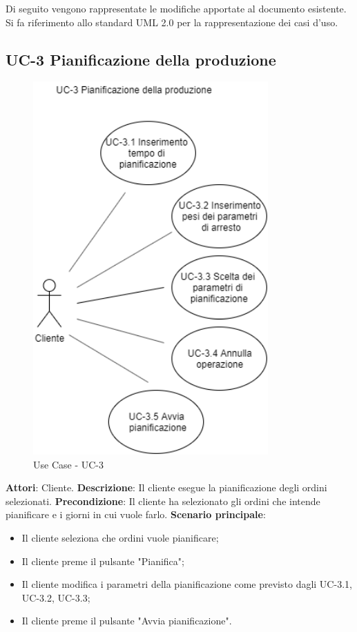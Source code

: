 Di seguito vengono rappresentate le modifiche apportate al documento esistente.
Si fa riferimento allo standard UML 2.0 per la rappresentazione dei casi d'uso.

\subsection*{UC-3 Pianificazione della produzione}

\begin{figure}[H]
	\includegraphics[width=9cm]{immagini/UC1.png}
	\centering
	\caption{Use Case - UC-3}
\end{figure}

\textbf{Attori}: Cliente. \newline
\textbf{Descrizione}: Il cliente esegue la pianificazione degli ordini selezionati.\newline
\textbf{Precondizione}: Il cliente ha selezionato gli ordini che intende pianificare e i giorni in cui vuole farlo.\newline
\textbf{Scenario principale}: \begin{itemize}
    \item Il cliente seleziona che ordini vuole pianificare;
    \item Il cliente preme il pulsante "Pianifica";
    \item Il cliente modifica i parametri della pianificazione come previsto dagli UC-3.1, UC-3.2, UC-3.3;
    \item Il cliente preme il pulsante "Avvia pianificazione".
\end{itemize}

